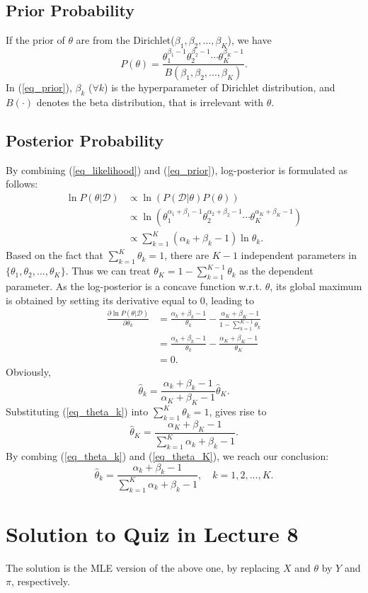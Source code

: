 \documentclass[10pt]{article}
\begin{document}
\subsection{Prior Probability}
If the prior of $\theta$ are from the Dirichlet($\beta_1,\beta_2,...,\beta_K$), we have
\begin{equation}
	P(\theta) = \frac{\theta_1^{\beta_1-1}\theta_2^{\beta_2-1}\cdots\theta_K^{\beta_K-1}}{B(\beta_1,\beta_2,...,\beta_K)}.
	\label{eq_prior}
\end{equation}
In (\ref{eq_prior}), $\beta_k$ ($\forall k$) is the hyperparameter of Dirichlet distribution, and
$B(\cdot)$ denotes the beta distribution, that is irrelevant with $\theta$.

\subsection{Posterior Probability}
By combining (\ref{eq_likelihood}) and (\ref{eq_prior}), log-posterior is formulated as follows:
\begin{align}
	\ln P(\theta|\mathcal{D}) 
	& \propto \ln \left( P(\mathcal{D}|\theta) P(\theta) \right) \nonumber \\
	& \propto \ln \left( \theta_1^{\alpha_1+\beta_1-1} \theta_2^{\alpha_2+\beta_2-1} \cdots \theta_K^{\alpha_K+\beta_K-1} \right) \nonumber \\
	& \propto \sum_{k=1}^K (\alpha_k+\beta_k-1) \ln \theta_k.	
	\label{eq_posterior}
\end{align}
Based on the fact that $\sum_{k=1}^K \theta_k = 1$, there are $K-1$ independent parameters in 
$\{ \theta_1,\theta_2,...,\theta_K\}$. Thus we can treat 
$\theta_K = 1 - \sum_{k=1}^{K-1} \theta_k$ as the dependent parameter.
As the log-posterior is a concave function w.r.t. $\theta$,
its global maximum is obtained by setting its derivative equal to 0, leading to
\begin{align}
	\frac{\partial 	\ln P(\theta|\mathcal{D}) }{\partial \theta_k} 
	& = \frac{\alpha_k+\beta_k-1}{\theta_k} - \frac{\alpha_K+\beta_K-1}{1-\sum_{k=1}^{K-1}\theta_k}  \nonumber \\
	& = \frac{\alpha_k+\beta_k-1}{\theta_k} - \frac{\alpha_K+\beta_K-1}{\theta_K} \nonumber \\
	& = 0.
	\label{eq_derivative}
\end{align}
Obviously, 
\begin{equation}
	\hat{\theta}_k = \frac{\alpha_k+\beta_k-1}{\alpha_K+\beta_K-1}\hat{\theta}_K.
	\label{eq_theta_k}
\end{equation}
Substituting (\ref{eq_theta_k}) into $\sum_{k=1}^K \theta_k = 1$, gives rise to
\begin{equation}
	\hat{\theta}_K = \frac{\alpha_K+\beta_K-1}{\sum_{k=1}^K \alpha_k+\beta_k-1}.
	\label{eq_theta_K}
\end{equation}
By combing (\ref{eq_theta_k}) and (\ref{eq_theta_K}), we reach our conclusion:
\begin{equation}
	\hat{\theta}_k = \frac{\alpha_k+\beta_k-1}{\sum_{k=1}^K \alpha_k+\beta_k-1}, \quad k = 1,2,...,K.
\end{equation}

\section{Solution to Quiz in Lecture 8}
The solution is the MLE version of the above one,
by replacing $X$ and $\theta$ by $Y$ and $\pi$, respectively. 
\end{document}
